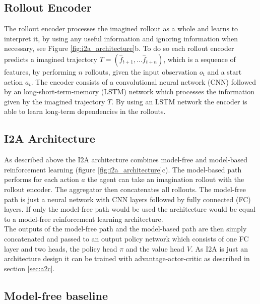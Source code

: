  
\subsection{Rollout Encoder}
 

The rollout encoder processes the imagined rollout as a whole and learns to interpret it, by using any useful information and ignoring information when necessary, see Figure \ref{fig:i2a_architecture}b.
To do so each rollout encoder predicts a imagined trajectory $T = (\hat{f}_{t+1}, ... \hat{f}_{t+n})$, which is a sequence of features, by performing $n$ rollouts, given the input observation $o_t$ and a start action $a_t$.
The encoder consists of a convolutional neural network (CNN) followed by an long-short-term-memory (LSTM) network which processes the information given by the imagined trajectory $T$. By using an LSTM network the encoder is able to learn long-term dependencies in the rollouts.\\

   
 
\subsection{I2A Architecture}


As described above the I2A architecture combines model-free and model-based reinforcement learning (figure \ref{fig:i2a_architecture}c).
The model-based path performs for each action $a$ the agent can take an imagination rollout with the rollout encoder.
The aggregator then concatenates all rollouts.
The model-free path is just a neural network with CNN layers followed by fully connected (FC) layers.
If only the model-free path would be used the architecture would be equal to a model-free reinforcement learning architecture.\\ 

The outputs of the model-free path and the model-based path are then simply concatenated and passed to an output policy network which consists of one FC layer and two heads, the policy head $\pi$ and the value head $V$.
As I2A is just an architecture design it can be trained with advantage-actor-critic as described in section \ref{sec:a2c}.\\

 
\subsection{Model-free baseline}

